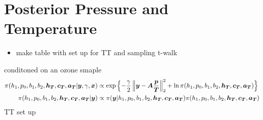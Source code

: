 \section{Posterior Pressure and Temperature}
\begin{itemize}
	\item make table with set up for TT and sampling t-walk
\end{itemize}
conditoned on an ozone smaple 
\begin{align*}
	\pi(h_1,p_0,b_1,b_2,\bm{h_T},\bm{c_T},\bm{a_T} | \bm{y}, \gamma, \bm{x}) &\propto \exp{\Bigl\{  -\frac{\gamma}{2} \left\Vert \bm{y}- \bm{A} \frac{\bm{p}}{\bm{T}}  \right\Vert_2^2 + \ln{\pi(h_1,p_0,b_1,b_2,\bm{h_T},\bm{c_T},\bm{a_T})} \Bigr\} } \\
	\pi(h_1,p_0,b_1,b_2,\bm{h_T},\bm{c_T},\bm{a_T} | \bm{y}) &\propto \pi(\bm{y}|h_1,p_0,b_1,b_2,\bm{h_T},\bm{c_T},\bm{a_T}) \pi(h_1,p_0,b_1,b_2,\bm{h_T},\bm{c_T},\bm{a_T}) \\
\end{align*}
TT set up
